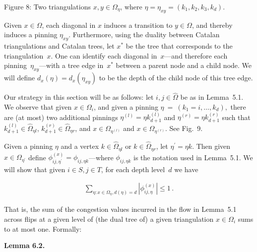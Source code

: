 \documentclass[10pt,a4paper]{article}
\begin{document}
Figure 8: Two triangulations $x,y\in\Omega_{\eta}$, where $\eta=\eta_{xy}=(k_{1},k_{2},k_{3},k_{d})$.



Given $x\in\Omega$, each diagonal in $x$ induces a transition to $y\in\Omega$, and thereby induces a pinning $\eta_{xy}$. Furthermore, using the duality between Catalan triangulations and Catalan trees, let $x^{*}$ be the tree that corresponds to the triangulation $x$. One can identify each diagonal in $x$—and therefore each pinning $\eta_{xy}$—with a tree edge in $x^{*}$ between a parent node and a child node. We will define $d_{x}(\eta)=d_{x}(\eta_{xy})$ to be the depth of the child node of this tree edge.\par




Our strategy in this section will be as follows: let $i,j\in\hat{\Omega}$ be as in Lemma 5.1. We observe that given $x\in\Omega_{i}$, and given a pinning $\eta~=~(k_{1}=i,\dots,k_{d}),$ there are (at most) two additional pinnings $\eta^{(l)}=\eta k_{d+1}^{(l)}$ and $\eta^{(r)}=\eta k_{d+1}^{(r)}$ such that $k_{d+1}^{(l)}\in\hat{\Omega}_{\eta l}$, $k_{d+1}^{(r)}\in\hat{\Omega}_{\eta r}$, and $x\in\Omega_{\eta^{(l)}}$ and $x\in\Omega_{\eta^{(r)}}$. See Fig. 9.\par




Given a pinning $\eta$ and a vertex $k\in\hat{\Omega}_{\eta l}$ or $k\in\hat{\Omega}_{\eta r}$, let $\eta^{\prime}=\eta k$. Then given $x\in\Omega_{\eta^{\prime}}$ define $\phi_{ij,\eta^{\prime}}^{(x)}=\phi_{ij,\eta k}$—where $\phi_{ij,\eta k}$ is the notation used in Lemma 5.1. We will show that given $i\in S,j\in T$, for each depth level $d$ we have\par


\[\begin{gathered}
\sum_{\eta:x\in\Omega_{\eta},d(\eta)=d}|\phi_{ij,\eta}^{(x)}|\leq 1\,.
\end{gathered}\]


That is, the sum of the congestion values incurred in the flow in Lemma 5.1 across flips at a given level of (the dual tree of) a given triangulation $x\in\Omega_{i}$ sums to at most one. Formally:\par





\par\medskip\noindent\textbf{\textbf{Lemma 6.2}\textbf{.}}\par
\end{document}
